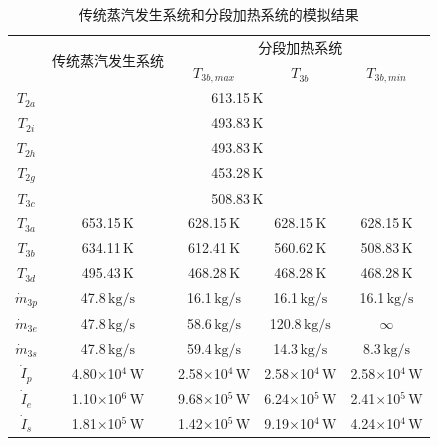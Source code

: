 \begin{table}[htbp]
\setlength{\abovecaptionskip}{-10pt}
	\caption{传统蒸汽发生系统和分段加热系统的模拟结果}
	\begin{center}
	\begin{tabular}{ccccc}
		\toprule
		& \multirow{2}{*}{传统蒸汽发生系统} & \multicolumn{3}{c}{分段加热系统}\\\cline{3-5}
 &  & $T_{3b,max}$ & $T_{3b}$ & $T_{3b,min}$\\
		\midrule
		$T_{2a}$ & \multicolumn{4}{c}{613.15$\,\mathrm{K}$}\\
		$T_{2i}$ & \multicolumn{4}{c}{493.83$\,\mathrm{K}$}\\
		$T_{2h}$ & \multicolumn{4}{c}{493.83$\,\mathrm{K}$}\\
		$T_{2g}$ & \multicolumn{4}{c}{453.28$\,\mathrm{K}$}\\
		$T_{3c}$ & \multicolumn{4}{c}{508.83$\,\mathrm{K}$}\\
		$T_{3a}$	&	653.15$\,\mathrm{K}$
	&	628.15$\,\mathrm{K}$	&	628.15$\,\mathrm{K}$	&	628.15$\,\mathrm{K}$\\
		$T_{3b}$	&	634.11$\,\mathrm{K}$	&	612.41$\,\mathrm{K}$	&	560.62$\,\mathrm{K}$	&	508.83$\,\mathrm{K}$\\
		$T_{3d}$	&	495.43$\,\mathrm{K}$
	&	468.28$\,\mathrm{K}$	&	468.28$\,\mathrm{K}$	&	468.28$\,\mathrm{K}$\\
		$\dot{m}_{3p}$	&	47.8$\,\mathrm{kg/s}$	&	16.1$\,\mathrm{kg/s}$	&	16.1$\,\mathrm{kg/s}$	&	16.1$\,\mathrm{kg/s}$\\
		$\dot{m}_{3e}$	&	47.8$\,\mathrm{kg/s}$	&	58.6$\,\mathrm{kg/s}$	&	120.8$\,\mathrm{kg/s}$	&	$\infty$\\
		$\dot{m}_{3s}$	&	47.8$\,\mathrm{kg/s}$	&	59.4$\,\mathrm{kg/s}$	&	14.3$\,\mathrm{kg/s}$	&	8.3$\,\mathrm{kg/s}$\\
		$\dot{I}_p$    &    4.80$\times$10$^4\,\mathrm{W}$    	&  2.58$\times$10$^4\,\mathrm{W}$  &	2.58$\times$10$^4\,\mathrm{W}$	&	2.58$\times$10$^4\,\mathrm{W}$\\
		$\dot{I}_e$    &    1.10$\times$10$^6\,\mathrm{W}$    	&  9.68$\times$10$^5\,\mathrm{W}$  &	6.24$\times$10$^5\,\mathrm{W}$	&	2.41$\times$10$^5\,\mathrm{W}$	\\
		$\dot{I}_s$    &    1.81$\times$10$^5\,\mathrm{W}$    	&  1.42$\times$10$^5\,\mathrm{W}$  &	9.19$\times$10$^4\,\mathrm{W}$	&	4.24$\times$10$^4\,\mathrm{W}$\\

\end{tabular}
\end{center}
\end{table}
